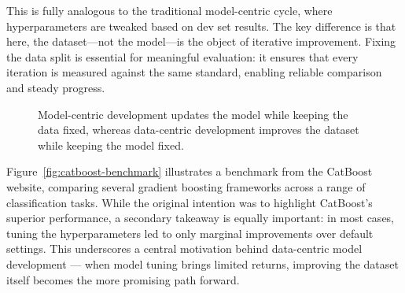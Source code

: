 \documentclass[12pt,openany, draft]{book}
\begin{document}
This is fully analogous to the traditional model-centric cycle, where hyperparameters are tweaked based on dev set results. The key difference is that here, the dataset—not the model—is the object of iterative improvement. Fixing the data split is essential for meaningful evaluation: it ensures that every iteration is measured against the same standard, enabling reliable comparison and steady progress.


\begin{figure}[H]
\centering
{}
\caption{Model-centric development updates the model while keeping the data fixed, whereas data-centric development improves the dataset while keeping the model fixed.}
\label{fig:model-vs-data-centric}
\end{figure}


Figure~\ref{fig:catboost-benchmark} illustrates a benchmark from the CatBoost website, comparing several gradient boosting frameworks across a range of classification tasks. While the original intention was to highlight CatBoost’s superior performance, a secondary takeaway is equally important: in most cases, tuning the hyperparameters led to only marginal improvements over default settings. This underscores a central motivation behind data-centric model development — when model tuning brings limited returns, improving the dataset itself becomes the more promising path forward.
\end{document}
